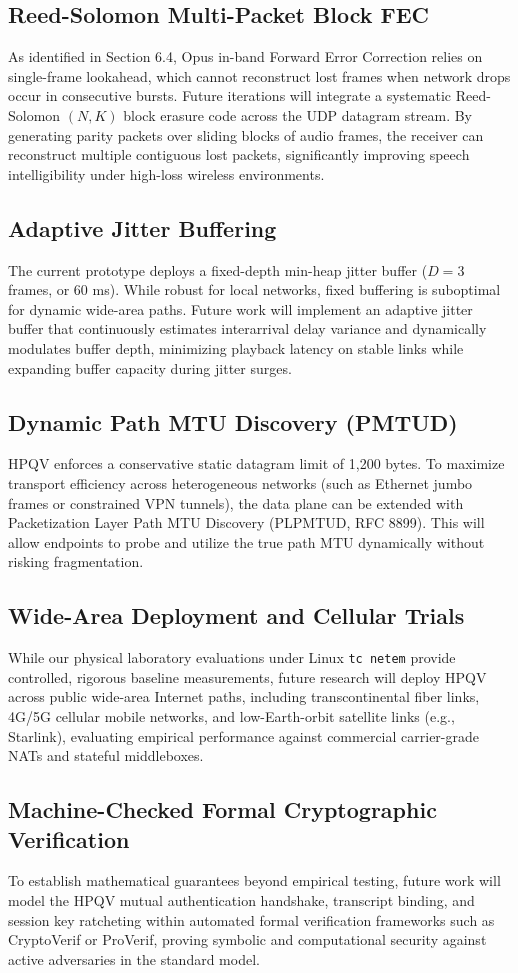 \subsection{Reed-Solomon Multi-Packet Block FEC}
As identified in Section 6.4, Opus in-band Forward Error Correction relies on single-frame lookahead, which cannot reconstruct lost frames when network drops occur in consecutive bursts. Future iterations will integrate a systematic Reed-Solomon $(N, K)$ block erasure code across the UDP datagram stream. By generating parity packets over sliding blocks of audio frames, the receiver can reconstruct multiple contiguous lost packets, significantly improving speech intelligibility under high-loss wireless environments.

\subsection{Adaptive Jitter Buffering}
The current prototype deploys a fixed-depth min-heap jitter buffer ($D=3$ frames, or 60 ms). While robust for local networks, fixed buffering is suboptimal for dynamic wide-area paths. Future work will implement an adaptive jitter buffer that continuously estimates interarrival delay variance and dynamically modulates buffer depth, minimizing playback latency on stable links while expanding buffer capacity during jitter surges.

\subsection{Dynamic Path MTU Discovery (PMTUD)}
HPQV enforces a conservative static datagram limit of 1,200 bytes. To maximize transport efficiency across heterogeneous networks (such as Ethernet jumbo frames or constrained VPN tunnels), the data plane can be extended with Packetization Layer Path MTU Discovery (PLPMTUD, RFC 8899). This will allow endpoints to probe and utilize the true path MTU dynamically without risking fragmentation.

\subsection{Wide-Area Deployment and Cellular Trials}
While our physical laboratory evaluations under Linux \texttt{tc netem} provide controlled, rigorous baseline measurements, future research will deploy HPQV across public wide-area Internet paths, including transcontinental fiber links, 4G/5G cellular mobile networks, and low-Earth-orbit satellite links (e.g., Starlink), evaluating empirical performance against commercial carrier-grade NATs and stateful middleboxes.

\subsection{Machine-Checked Formal Cryptographic Verification}
To establish mathematical guarantees beyond empirical testing, future work will model the HPQV mutual authentication handshake, transcript binding, and session key ratcheting within automated formal verification frameworks such as CryptoVerif \cite{blanchet2024postquantum} or ProVerif, proving symbolic and computational security against active adversaries in the standard model.
